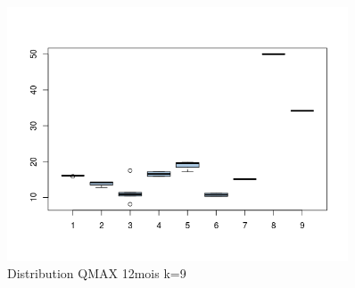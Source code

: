 \begin{figure}[H]
\centering
\includegraphics[width=0.90\textwidth]{../Fig/RTUPB/rtupb-qmax-k9-distribution}
\caption{Distribution QMAX  12mois  k=9 }
\end{figure}












%
